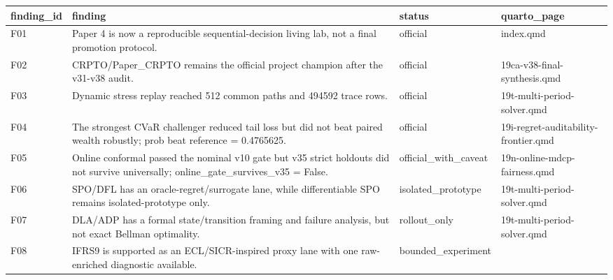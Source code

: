 \documentclass[
  spanish,
  11pt,
  letterpaper,
]{scrbook}
\newcounter{none} %
\theoremstyle{plain}
\theoremstyle{remark}
\begin{document}
{\def\LTcaptype{none} %
\begin{longtable}[]{@{}
  >{\raggedright\arraybackslash}p{}
  >{\raggedright\arraybackslash}p{}
  >{\raggedright\arraybackslash}p{}
  >{\raggedright\arraybackslash}p{}@{}}
\toprule\noalign{}
\begin{minipage}[b]{\linewidth}\raggedright
finding\_id
\end{minipage} & \begin{minipage}[b]{\linewidth}\raggedright
finding
\end{minipage} & \begin{minipage}[b]{\linewidth}\raggedright
status
\end{minipage} & \begin{minipage}[b]{\linewidth}\raggedright
quarto\_page
\end{minipage} \\
\midrule\noalign{}
\endhead
\bottomrule\noalign{}
\endlastfoot
F01 & Paper 4 is now a reproducible sequential-decision living lab, not
a final promotion protocol. & official & index.qmd \\
F02 & CRPTO/Paper\_CRPTO remains the official project champion after the
v31-v38 audit. & official & 19ca-v38-final-synthesis.qmd \\
F03 & Dynamic stress replay reached 512 common paths and 494592 trace
rows. & official & 19t-multi-period-solver.qmd \\
F04 & The strongest CVaR challenger reduced tail loss but did not beat
paired wealth robustly; prob beat reference = 0.4765625. & official &
19i-regret-auditability-frontier.qmd \\
F05 & Online conformal passed the nominal v10 gate but v35 strict
holdouts did not survive universally; online\_gate\_survives\_v35 =
False. & official\_with\_caveat & 19n-online-mdcp-fairness.qmd \\
F06 & SPO/DFL has an oracle-regret/surrogate lane, while differentiable
SPO remains isolated-prototype only. & isolated\_prototype &
19t-multi-period-solver.qmd \\
F07 & DLA/ADP has a formal state/transition framing and failure
analysis, but not exact Bellman optimality. & rollout\_only &
19t-multi-period-solver.qmd \\
F08 & IFRS9 is supported as an ECL/SICR-inspired proxy lane with one
raw-enriched diagnostic available. & bounded\_experiment &

\end{longtable}}
\end{document}
